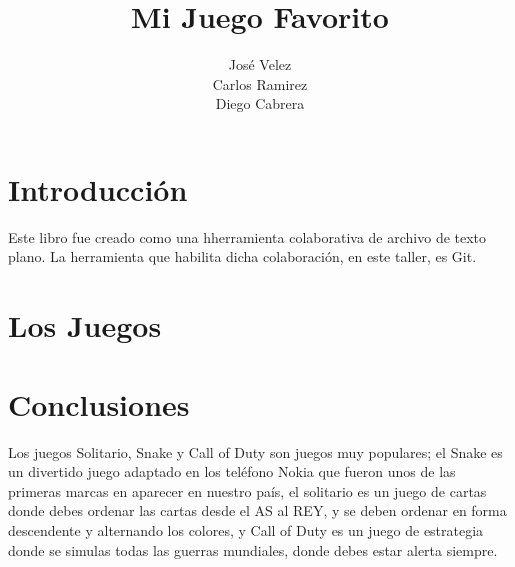 \documentclass[12pt,oneside]{book}
\title{Mi Juego Favorito}
\author{José Velez
\\Carlos Ramirez
\\Diego Cabrera}
\begin{document}
\maketitle
\tableofcontents

\chapter{Introducción}
Este libro fue creado como una hherramienta colaborativa de archivo de texto plano. La herramienta que habilita dicha colaboración, en este taller, es Git.

\chapter{Los Juegos}



%

\chapter{Conclusiones}
Los juegos Solitario, Snake y Call of Duty son juegos muy populares; el Snake es un divertido juego adaptado en los teléfono Nokia que fueron unos de las primeras marcas en aparecer en nuestro país, el solitario es un juego de cartas donde debes ordenar las cartas desde el AS al REY, y se deben ordenar en forma descendente y alternando los colores, y Call of Duty es un juego de estrategia donde se simulas todas las guerras mundiales, donde debes estar alerta siempre.
\end{document}
